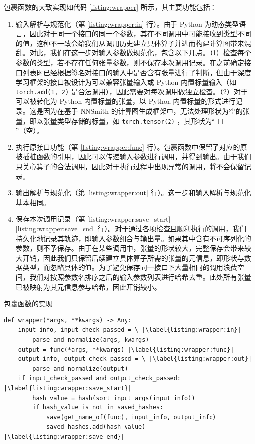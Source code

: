 包裹函数的大致实现如代码 \ref{listing:wrapper} 所示，其主要功能包括：

\begin{enumerate}
    \item 输入解析与规范化（第 \ref{listing:wrapper:in} 行）。由于 Python 为动态类型语言，因此对于同一个接口的同一个参数，其在不同调用中可能接收到类型不同的值，这种不一致会给我们从调用历史建立具体算子并进而构建计算图带来混乱。对此，我们在这一步对输入参数做规范化，包含以下几点。（1）检查每个参数的类型，若不存在任何张量参数，则不保存本次调用记录。在之前确定接口列表时已经根据签名对接口的输入中是否含有张量进行了判断，但由于深度学习框架的接口被设计为可以兼容张量输入或 Python 内置标量输入（如 \texttt{torch.add(1, 2)} 是合法调用），因此需要对每次调用做独立检查。（2）对于可以被转化为 Python 内置标量的张量，以 Python 内置标量的形式进行记录。这是因为在基于 NNSmith 的计算图生成框架中，无法处理形状为空的张量，即以张量类型存储的标量，如 \texttt{torch.tensor(2)} ，其形状为“ \texttt{[]} ”（空）。
    \item 执行原接口功能（第 \ref{listing:wrapper:func} 行）。包裹函数中保留了对应的原被插桩函数的引用，因此可以传递输入参数进行调用，并得到输出。由于我们只关心算子的合法调用，因此对于执行过程中出现异常的调用，将不会保留记录。
    \item 输出解析与规范化（第 \ref{listing:wrapper:out} 行）。这一步和输入解析与规范化基本相同。
    \item 保存本次调用记录（第 \ref{listing:wrapper:save_start} - \ref{listing:wrapper:save_end} 行）。对于通过各项检查且顺利执行的调用，我们持久化地记录其轨迹，即输入参数组合与输出量。如果其中含有不可序列化的参数，则不予保存。由于在某些调用中，张量的形状较大，完整保存会带来较大开销，因此我们只保留后续建立具体算子所需的张量的元信息，即形状与数据类型，而忽略具体的值。为了避免保存同一接口下大量相同的调用浪费空间，我们对按照参数名排序之后的输入参数列表进行哈希去重。此处所有张量已被映射为其元信息参与哈希，因此开销较小。
\end{enumerate}

\begin{listing}[]
    \caption{包裹函数的实现}
    \label{listing:wrapper}
\begin{verbatim}
def wrapper(*args, **kwargs) -> Any:
    input_info, input_check_passed = \ |\label{listing:wrapper:in}|
        parse_and_normalize(args, kwargs)
    output = func(*args, **kwargs) |\label{listing:wrapper:func}|
    output_info, output_check_passed = \ |\label{listing:wrapper:out}|
        parse_and_normalize(output)
    if input_check_passed and output_check_passed: |\label{listing:wrapper:save_start}|
        hash_value = hash(sort_input_args(input_info))
        if hash_value is not in saved_hashes:
            save(get_name_of(func), input_info, output_info)
            saved_hashes.add(hash_value) |\label{listing:wrapper:save_end}|
\end{verbatim}
\end{listing}

